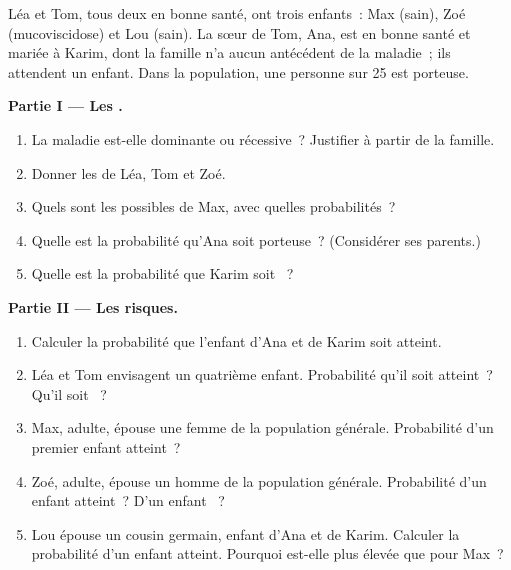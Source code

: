 \begin{problem}
\label{pb:g11:genes-and-disease:1}
Léa et Tom, tous deux en bonne santé, ont trois enfants~: Max (sain),
Zoé (mucoviscidose) et Lou (sain). La sœur de Tom, Ana, est en bonne
santé et mariée à Karim, dont la famille n'a aucun antécédent de la
maladie~; ils attendent un enfant. Dans la population, une personne sur
25 est porteuse.

\medskip
\noindent\textbf{Partie I --- Les .}
\begin{enumerate}
  \item La maladie est-elle dominante ou récessive~? Justifier à partir
        de la famille.
  \item Donner les  de Léa, Tom et Zoé.
  \item Quels sont les  possibles de Max, avec quelles
        probabilités~?
  \item Quelle est la probabilité qu'Ana soit porteuse~? (Considérer
        ses parents.)
  \item Quelle est la probabilité que Karim soit ~?
\end{enumerate}

\medskip
\noindent\textbf{Partie II --- Les risques.}
\begin{enumerate}[resume]
  \item Calculer la probabilité que l'enfant d'Ana et de Karim soit
        atteint.
  \item Léa et Tom envisagent un quatrième enfant. Probabilité qu'il
        soit atteint~? Qu'il soit ~?
  \item Max, adulte, épouse une femme de la population générale.
        Probabilité d'un premier enfant atteint~?
  \item Zoé, adulte, épouse un homme de la population générale.
        Probabilité d'un enfant atteint~? D'un enfant ~?
  \item Lou épouse un cousin germain, enfant d'Ana et de Karim.
        Calculer la probabilité d'un enfant atteint. Pourquoi est-elle
        plus élevée que pour Max~?
\end{enumerate}


\end{problem}
